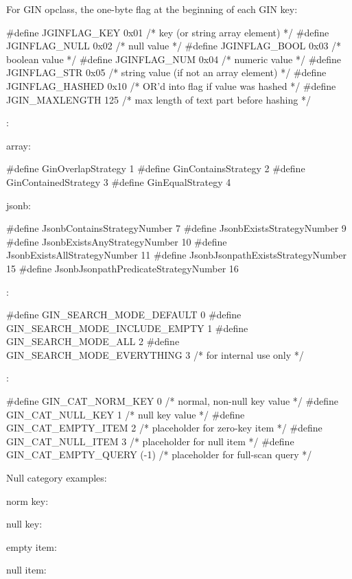 For  GIN opclass, the one-byte flag at the beginning of
each GIN key:

\begin{ccode}
#define JGINFLAG_KEY    0x01    /* key (or string array element) */
#define JGINFLAG_NULL   0x02    /* null value */
#define JGINFLAG_BOOL   0x03    /* boolean value */
#define JGINFLAG_NUM    0x04    /* numeric value */
#define JGINFLAG_STR    0x05    /* string value (if not an array element) */
#define JGINFLAG_HASHED 0x10    /* OR'd into flag if value was hashed */
#define JGIN_MAXLENGTH  125     /* max length of text part before hashing */
\end{ccode}

:

\begin{oparts}
\item array:
  \begin{ccode}
  #define GinOverlapStrategy      1
  #define GinContainsStrategy     2
  #define GinContainedStrategy    3
  #define GinEqualStrategy        4
  \end{ccode}
\item jsonb:
  \begin{ccode}
  #define JsonbContainsStrategyNumber   7
  #define JsonbExistsStrategyNumber   9
  #define JsonbExistsAnyStrategyNumber  10
  #define JsonbExistsAllStrategyNumber  11
  #define JsonbJsonpathExistsStrategyNumber   15
  #define JsonbJsonpathPredicateStrategyNumber  16
  \end{ccode}
\end{oparts}

:

\begin{ccode}
#define GIN_SEARCH_MODE_DEFAULT         0
#define GIN_SEARCH_MODE_INCLUDE_EMPTY   1
#define GIN_SEARCH_MODE_ALL             2
#define GIN_SEARCH_MODE_EVERYTHING      3   /* for internal use only */
\end{ccode}

:

\begin{ccode}
#define GIN_CAT_NORM_KEY        0   /* normal, non-null key value */
#define GIN_CAT_NULL_KEY        1   /* null key value */
#define GIN_CAT_EMPTY_ITEM      2   /* placeholder for zero-key item */
#define GIN_CAT_NULL_ITEM       3   /* placeholder for null item */
#define GIN_CAT_EMPTY_QUERY     (-1)    /* placeholder for full-scan query */
\end{ccode}

Null category examples:

\begin{oparts}
\item norm key:
\item null key:
\item empty item:
\item null item:
\end{oparts}

